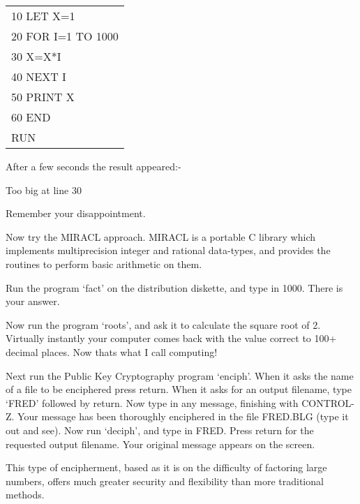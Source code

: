 \begin{bf}
\begin{center}
\begin{tabular}{l}
                       10 LET X=1          \\
                       20 FOR I=1 TO 1000   \\
                       30 X=X*I            \\
                       40 NEXT I           \\
                       50 PRINT X          \\
                       60 END              \\

                       RUN                 \\
\end{tabular}
\end{center}
\end{bf}

After a few seconds the result appeared:-

\begin{bf}
\begin{center}
                       Too big at line 30
\end{center}
\end{bf}

Remember your disappointment.

Now try the MIRACL approach. MIRACL is a portable C library which  implements  
multiprecision integer and rational data-types, and provides the routines to 
perform  basic  arithmetic  on them.

Run the program `fact' on the distribution diskette, and type in 1000. There 
is your answer.  

Now  run the program `roots',  and ask it to calculate the square root of 
2. Virtually instantly your computer comes 
back with the value correct to 100+ decimal places. Now thats what I call 
computing!  

Next  run the Public Key Cryptography program `enciph'.  When it asks the 
name of a file to be enciphered press return.  When it asks for an output 
filename,  type  `FRED'  followed  by  return.  Now  type in any message, 
finishing with CONTROL-Z.  Your  message  has  been  thoroughly 
enciphered in the file FRED.BLG (type it out and see).  Now run `deciph', 
and type in FRED.  Press return for the requested output  filename.  Your 
original message appears on the screen.  

This type of encipherment,  based as it is on the difficulty of factoring 
large numbers,  offers much greater security and  flexibility  than  more 
traditional methods.  

